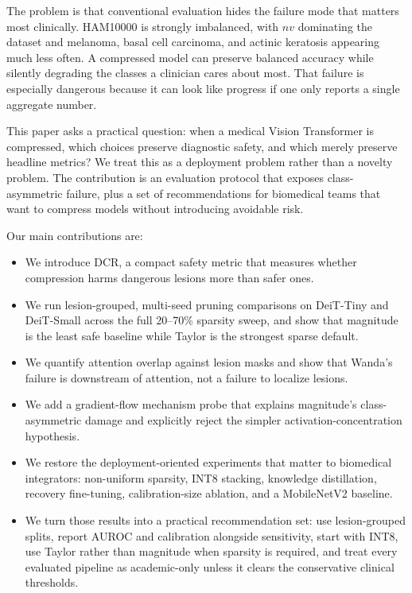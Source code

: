 \documentclass{article}
\newcommand{\nv}{\ensuremath{\textit{nv}}}
\newcommand{\DCR}{\ensuremath{\mathrm{DCR}}}
\begin{document}
The problem is that conventional evaluation hides the failure mode that matters most clinically. HAM10000 is strongly imbalanced, with \nv{} dominating the dataset and melanoma, basal cell carcinoma, and actinic keratosis appearing much less often. A compressed model can preserve balanced accuracy while silently degrading the classes a clinician cares about most. That failure is especially dangerous because it can look like progress if one only reports a single aggregate number.

This paper asks a practical question: when a medical Vision Transformer is compressed, which choices preserve diagnostic safety, and which merely preserve headline metrics? We treat this as a deployment problem rather than a novelty problem. The contribution is an evaluation protocol that exposes class-asymmetric failure, plus a set of recommendations for biomedical teams that want to compress models without introducing avoidable risk.

Our main contributions are:
\begin{itemize}[leftmargin=*,itemsep=2pt,topsep=2pt]
\item We introduce \DCR{}, a compact safety metric that measures whether compression harms dangerous lesions more than safer ones.
\item We run lesion-grouped, multi-seed pruning comparisons on DeiT-Tiny and DeiT-Small across the full 20--70\% sparsity sweep, and show that magnitude is the least safe baseline while Taylor is the strongest sparse default.
\item We quantify attention overlap against lesion masks and show that Wanda's failure is downstream of attention, not a failure to localize lesions.
\item We add a gradient-flow mechanism probe that explains magnitude's class-asymmetric damage and explicitly reject the simpler activation-concentration hypothesis.
\item We restore the deployment-oriented experiments that matter to biomedical integrators: non-uniform sparsity, INT8 stacking, knowledge distillation, recovery fine-tuning, calibration-size ablation, and a MobileNetV2 baseline.
\item We turn those results into a practical recommendation set: use lesion-grouped splits, report AUROC and calibration alongside sensitivity, start with INT8, use Taylor rather than magnitude when sparsity is required, and treat every evaluated pipeline as academic-only unless it clears the conservative clinical thresholds.
\end{itemize}
\end{document}
